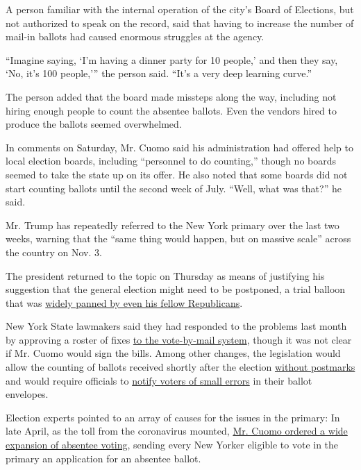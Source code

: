 A person familiar with the internal operation of the city's Board of
Elections, but not authorized to speak on the record, said that having
to increase the number of mail-in ballots had caused enormous struggles
at the agency.

``Imagine saying, `I'm having a dinner party for 10 people,' and then
they say, `No, it's 100 people,''' the person said. ``It's a very deep
learning curve.''

The person added that the board made missteps along the way, including
not hiring enough people to count the absentee ballots. Even the vendors
hired to produce the ballots seemed overwhelmed.

In comments on Saturday, Mr. Cuomo said his administration had offered
help to local election boards, including ``personnel to do counting,''
though no boards seemed to take the state up on its offer. He also noted
that some boards did not start counting ballots until the second week of
July. ``Well, what was that?'' he said.

Mr. Trump has repeatedly referred to the New York primary over the last
two weeks, warning that the ``same thing would happen, but on massive
scale'' across the country on Nov. 3.

The president returned to the topic on Thursday as means of justifying
his suggestion that the general election might need to be postponed, a
trial balloon that was
\href{https://www.nytimes3xbfgragh.onion/2020/07/31/us/politics/trump-tweet-democracy.html}{widely
panned by even his fellow Republicans}.

New York State lawmakers said they had responded to the problems last
month by approving a roster of fixes
\href{https://www.nysenate.gov/newsroom/press-releases/senate-majority-advances-automatic-voter-registration-system-strengthens}{to
the vote-by-mail system}, though it was not clear if Mr. Cuomo would
sign the bills. Among other changes, the legislation would allow the
counting of ballots received shortly after the election
\href{https://www.nysenate.gov/legislation/bills/2019/s8799/amendment/a}{without
postmarks} and would require officials to
\href{https://www.nysenate.gov/legislation/bills/2019/s8370/amendment/b}{notify
voters of small errors} in their ballot envelopes.

Election experts pointed to an array of causes for the issues in the
primary: In late April, as the toll from the coronavirus mounted,
\href{https://www.governor.ny.gov/news/amid-ongoing-covid-19-pandemic-governor-cuomo-issues-executive-order-make-sure-every-new-yorker}{Mr.
Cuomo ordered a wide expansion of absentee voting}, sending every New
Yorker eligible to vote in the primary an application for an absentee
ballot.

